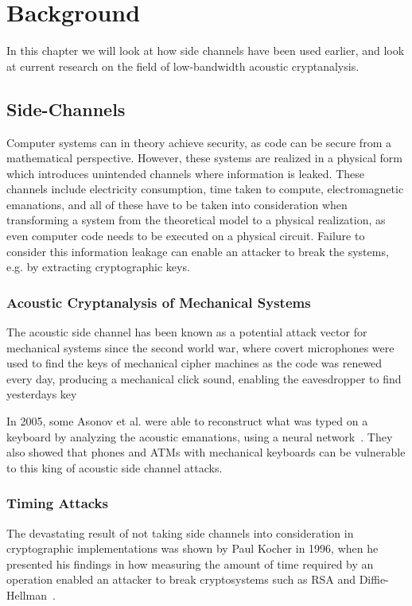 \chapter{Background}\label{chp:background} 
In this chapter we will look at how side channels have been used earlier, and look at current research on the field of low-bandwidth acoustic cryptanalysis.


\section{Side-Channels}\label{chp2:sec:side_channel}
Computer systems can in theory achieve security, as code can be secure from a mathematical perspective.
However, these systems are realized in a physical form which introduces unintended channels where information is leaked.
These channels include electricity consumption, time taken to compute, electromagnetic emanations, and all of these have to be taken into consideration when transforming a system from the theoretical model to a physical realization, as even computer code needs to be executed on a physical circuit.
Failure to consider this information leakage can enable an attacker to break the systems, e.g. by extracting cryptographic keys.

\subsection{Acoustic Cryptanalysis of Mechanical Systems}\label{chp2:subsec:acoustic_cryptanalysis}
The acoustic side channel has been known as a potential attack vector for mechanical systems since the second world war, where covert microphones were used to find the keys of mechanical cipher machines as the code was renewed every day, producing a mechanical click sound, enabling the eavesdropper to find yesterdays key

In 2005, some Asonov et al. were able to reconstruct what was typed on a keyboard by analyzing the acoustic emanations, using a neural network~\cite{DBLP:conf/sp/AsonovA04}. 
They also showed that phones and ATMs with mechanical keyboards can be vulnerable to this king of acoustic side channel attacks.

\subsection{Timing Attacks}\label{chp2:subsec:timing_attacks}
The devastating result of not taking side channels into consideration in cryptographic implementations was shown by Paul Kocher in 1996, when he presented his findings in how measuring the amount of time required by an operation enabled an attacker to break cryptosystems such as RSA and Diffie-Hellman~\cite{DBLP:conf/crypto/Kocher96}.

